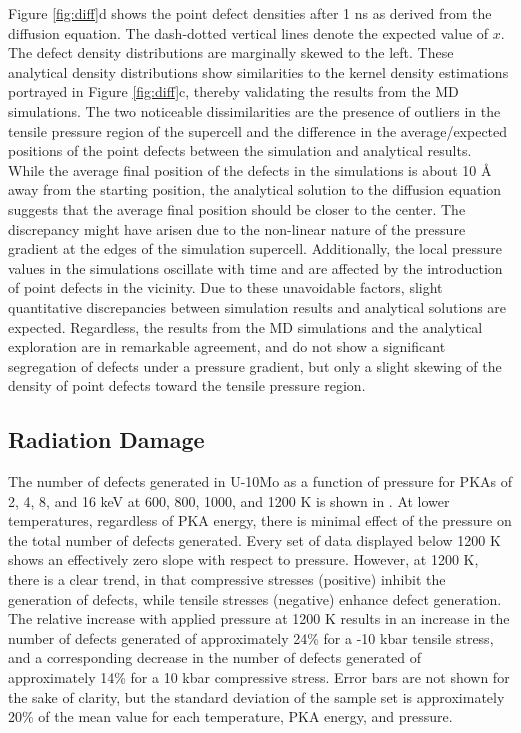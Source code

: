 \documentclass[review]{elsarticle}
\begin{document}
Figure \ref{fig:diff}d shows the point defect densities after 1 ns as derived from the diffusion equation. The dash-dotted vertical lines denote the expected value of $x$. The defect density distributions are marginally skewed to the left. These analytical density distributions show similarities to the kernel density estimations portrayed in Figure \ref{fig:diff}c, thereby validating the results from the MD simulations. The two noticeable dissimilarities are the presence of outliers in the tensile pressure region of the supercell and the difference in the average/expected positions of the point defects between the simulation and analytical results. While the average final position of the defects in the simulations is about 10 \r{A} away from the starting position, the analytical solution to the diffusion equation suggests that the average final position should be closer to the center. The discrepancy might have arisen due to the non-linear nature of the pressure gradient at the edges of the simulation supercell. Additionally, the local pressure values in the simulations oscillate with time and are affected by the introduction of point defects in the vicinity. Due to these unavoidable factors, slight quantitative discrepancies between simulation results and analytical solutions are expected. Regardless, the results from the MD simulations and the analytical exploration are in remarkable agreement, and do not show a significant segregation of defects under a pressure gradient, but only a slight skewing of the  density of point defects toward the tensile pressure region. 

\FloatBarrier

\subsection{Radiation Damage}

The number of defects generated in U-10Mo as a function of pressure for PKAs of 2, 4, 8, and 16 keV at 600, 800, 1000, and 1200 K is shown in . At lower temperatures, regardless of PKA energy, there is minimal effect of the pressure on the total number of defects generated. Every set of data displayed below 1200 K shows an effectively zero slope with respect to pressure. However, at 1200 K, there is a clear trend, in that compressive stresses (positive) inhibit the generation of defects, while tensile stresses (negative) enhance defect generation. The relative increase with applied pressure at 1200 K results in an increase in the number of defects generated of approximately 24\% for a -10 kbar tensile stress, and a corresponding decrease in the number of defects generated of approximately 14\% for a 10 kbar compressive stress. Error bars are not shown for the sake of clarity, but the standard deviation of the sample set is approximately 20\% of the mean value for each temperature, PKA energy, and pressure. 
\end{document}
